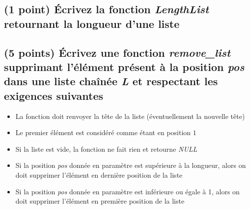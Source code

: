 \documentclass[11pt,a4paper]{article}
\begin{document}
\vspace*{-0.5cm}

\subsection{(1 point) \'Ecrivez la fonction \textit{LengthList} retournant la longueur d'une liste }




\clearpage


%
%


\subsection{(5 points) \'Ecrivez une fonction \textit{remove\_list} supprimant l'élément présent à la position \textit{pos} dans une liste chaînée \textit{L} et respectant les exigences suivantes }

\begin{itemize}
\item La fonction doit renvoyer la tête de la liste (éventuellement la nouvelle tête)
\item Le premier élément est considéré comme étant en position $ 1 $
\item Si la liste est vide, la fonction ne fait rien et retourne \textit{NULL}
\item Si la position \textit{pos} donnée en paramètre est supérieure à la longueur, alors on doit supprimer l'élément en dernière position de la liste
\item Si la position \textit{pos} donnée en paramètre est inférieure ou égale à 1, alors on doit supprimer l'élément en première position de la liste
\end{itemize}
\end{document}
